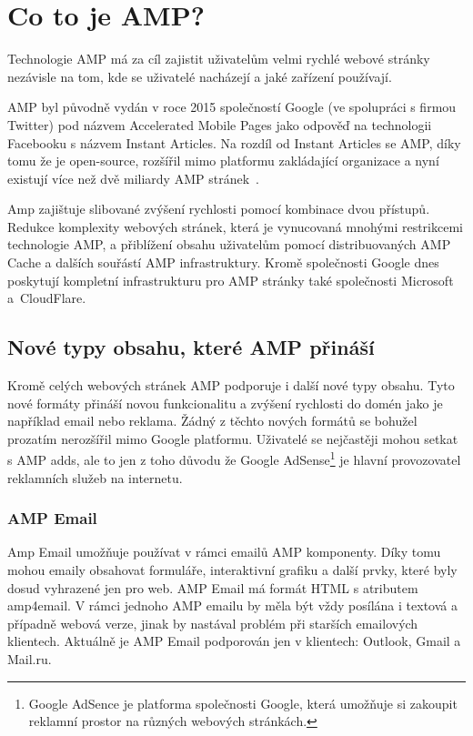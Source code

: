 \chapter{Co to je AMP?}
\label{AMP}
Technologie AMP má za cíl zajistit uživatelům velmi rychlé webové stránky nezávisle na tom, kde se
uživatelé nacházejí a jaké zařízení používají.

AMP byl původně vydán v roce 2015 společností Google (ve spolupráci s firmou Twitter) pod názvem Accelerated Mobile Pages jako odpověď
na technologii Facebooku s názvem Instant Articles. Na rozdíl od Instant Articles se AMP, díky tomu že je
open-source, rozšířil mimo platformu zakládající organizace a nyní existují více než dvě miliardy AMP
stránek~\cite{AMPTurbo}.

Amp zajištuje slibované zvýšení rychlosti pomocí kombinace dvou přístupů. Redukce komplexity webových stránek, která je vynucovaná mnohými restrikcemi technologie AMP, a přiblížení obsahu uživatelům pomocí distribuovaných AMP Cache a dalších souřástí AMP infrastruktury. Kromě společnosti Google dnes poskytují kompletní infrastrukturu pro AMP stránky také
společnosti Microsoft a~CloudFlare.

\section{Nové typy obsahu, které AMP přináší}
Kromě celých webových stránek AMP podporuje i další nové typy obsahu. Tyto nové formáty přináší novou funkcionalitu a zvýšení rychlosti do domén jako je například email nebo reklama. Žádný z těchto nových formátů se bohužel prozatím nerozšířil mimo Google platformu. Uživatelé se nejčastěji mohou setkat s AMP adds, ale to jen z toho důvodu že Google AdSense\footnote{Google AdSence je platforma společnosti Google, která umožňuje si zakoupit reklamní prostor na různých webových stránkách.} je hlavní provozovatel reklamních služeb na internetu.
\subsection*{AMP Email}
Amp Email umožňuje používat v rámci emailů AMP komponenty. Díky tomu mohou emaily obsahovat formuláře, interaktivní grafiku a další prvky, které byly dosud vyhrazené jen pro web. AMP Email má formát HTML s atributem amp4email. V rámci jednoho AMP emailu by měla být vždy posílána i textová a případně webová verze, jinak by nastával problém při starších emailových klientech\cite[Ch.\ 6, p.\ 285]{VzhuruDoAMP}.
Aktuálně je AMP Email podporován jen v klientech:
Outlook, Gmail a Mail.ru\cite{EmailSupport}.
